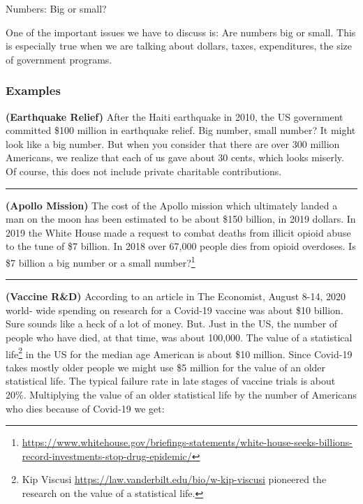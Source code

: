 \documentclass[
]{book}
\begin{document}
Numbers: Big or small?

One of the important issues we have to discuss is: Are numbers big or small. This is especially true when we are talking about dollars, taxes, expenditures, the size of government programs.

\hypertarget{examples}{%
\subsubsection{Examples}\label{examples}}

\textbf{(Earthquake Relief)} After the Haiti earthquake in 2010, the US government committed \$100 million in earthquake relief. Big number, small number? It might look like a big number. But when you consider that there are over 300 million Americans, we realize that each of us gave about 30 cents, which looks miserly. Of course, this does not include private charitable contributions.

\begin{center}\rule{0.5\linewidth}{0.5pt}\end{center}

\textbf{(Apollo Mission)} The cost of the Apollo mission which ultimately landed a man on the moon has been estimated to be about \$150 billion, in 2019 dollars. In 2019 the White House made a request to combat deaths from illicit opioid abuse to the tune of \$7 billion. In 2018 over 67,000 people dies from opioid overdoses. Is \$7 billion a big number or a small number?\footnote{\url{https://www.whitehouse.gov/briefings-statements/white-house-seeks-billions-record-investments-stop-drug-epidemic/}}

\begin{center}\rule{0.5\linewidth}{0.5pt}\end{center}

\textbf{(Vaccine R\&D)} According to an article in The Economist, August 8-14, 2020 world- wide spending on research for a Covid-19 vaccine was about \$10 billion. Sure sounds like a heck of a lot of money. But. Just in the US, the number of people who have died, at that time, was about 100,000. The value of a statistical life\footnote{Kip Viscusi \url{https://law.vanderbilt.edu/bio/w-kip-viscusi} pioneered the research on the value of a statistical life.} in the US for the median age American is about \$10 million. Since Covid-19 takes mostly older people we might use \$5 million for the value of an older statistical life. The typical failure rate in late stages of vaccine trials is about 20\%. Multiplying the value of an older statistical life by the number of Americans who dies because of Covid-19 we get:
\end{document}

